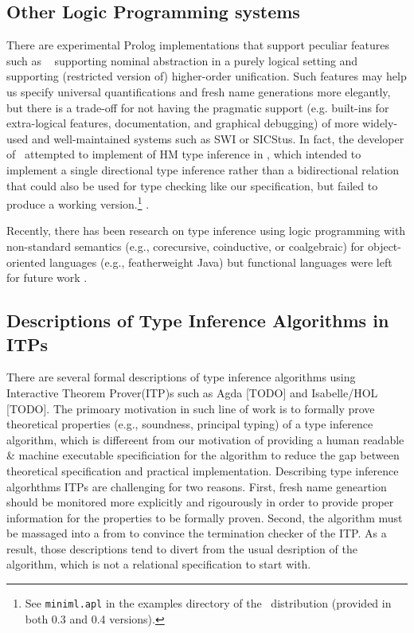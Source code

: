 \subsection{Other Logic Programming systems}
There are experimental Prolog implementations that support peculiar features
such as \aProlog\ \cite{cheney04iclp} supporting nominal abstraction in a purely
logical setting and \lProlog\ \cite{nadathur99cade} supporting (restricted
version of) higher-order unification. Such features may help us specify universal
quantifications and fresh name generations more elegantly, but there is a
trade-off for not having the pragmatic support (e.g. built-ins for extra-logical
features, documentation, and graphical debugging) of more widely-used and
well-maintained systems such as SWI or SICStus. In fact, the developer of
\aProlog\ attempted to implement of HM type inference in \aProlog, which
intended to implement a single directional type inference rather than 
a bidirectional relation that could also be used for type checking like
our specification, but failed to produce a working version.\footnote{
	See \texttt{miniml.apl} in the examples directory of
	the \aProlog\ distribution (provided in both 0.3 and 0.4 versions). }
.



Recently, there has been research on type inference using logic programming
with non-standard semantics (e.g., corecursive, coinductive, or coalgebraic)
for object-oriented languages (e.g., featherweight Java) but
functional languages were left for future work \cite{AL-ECOOP09}.


\subsection{Descriptions of Type Inference Algorithms in ITPs}
There are several formal descriptions of type inference algorithms using
Interactive Theorem Prover(ITP)s such as
Agda [TODO] and Isabelle/HOL [TODO].
The primoary motivation in such line of work is to formally prove
theoretical properties (e.g., soundness, principal typing) of a
type inference algorithm, which is differeent from our motivation of
providing a human readable \& machine executable specificiation for
the algorithm to reduce the gap between theoretical specification and
practical implementation. Describing type inference algorhthms ITPs
are challenging for two reasons. First, fresh name geneartion should
be monitored more explicitly and rigourously in order to provide proper
information for the properties to be formally proven. Second, the algorithm
must be massaged into a from to convince the termination checker of the ITP.
As a result, those descriptions tend to divert from the usual desription of
the algorithm, which is not a relational specification to start with.

